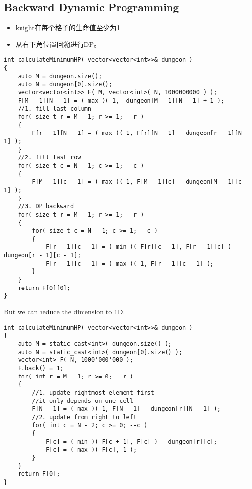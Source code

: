 \subsection{Backward Dynamic Programming}

\begin{itemize}
\item knight在每个格子的生命值至少为1
\item 从右下角位置回溯进行DP。
\end{itemize}
\setcounter{lstlisting}{0}
\begin{lstlisting}[style=customc, caption={2D DP}]
int calculateMinimumHP( vector<vector<int>>& dungeon )
{
    auto M = dungeon.size();
    auto N = dungeon[0].size();
    vector<vector<int>> F( M, vector<int>( N, 1000000000 ) );
    F[M - 1][N - 1] = ( max )( 1, -dungeon[M - 1][N - 1] + 1 );
    //1. fill last column
    for( size_t r = M - 1; r >= 1; --r )
    {
        F[r - 1][N - 1] = ( max )( 1, F[r][N - 1] - dungeon[r - 1][N - 1] );
    }
    //2. fill last row
    for( size_t c = N - 1; c >= 1; --c )
    {
        F[M - 1][c - 1] = ( max )( 1, F[M - 1][c] - dungeon[M - 1][c - 1] );
    }
    //3. DP backward
    for( size_t r = M - 1; r >= 1; --r )
    {
        for( size_t c = N - 1; c >= 1; --c )
        {
            F[r - 1][c - 1] = ( min )( F[r][c - 1], F[r - 1][c] ) - dungeon[r - 1][c - 1];
            F[r - 1][c - 1] = ( max )( 1, F[r - 1][c - 1] );
        }
    }
    return F[0][0];
}
\end{lstlisting}

But we can reduce the dimension to 1D. 

\begin{lstlisting}[style=customc, caption={1D DP}]
int calculateMinimumHP( vector<vector<int>>& dungeon )
{
    auto M = static_cast<int>( dungeon.size() );
    auto N = static_cast<int>( dungeon[0].size() );
    vector<int> F( N, 1000'000'000 );
    F.back() = 1;
    for( int r = M - 1; r >= 0; --r )
    {
        //1. update rightmost element first
        //it only depends on one cell
        F[N - 1] = ( max )( 1, F[N - 1] - dungeon[r][N - 1] );
        //2. update from right to left
        for( int c = N - 2; c >= 0; --c )
        {
            F[c] = ( min )( F[c + 1], F[c] ) - dungeon[r][c];
            F[c] = ( max )( F[c], 1 );
        }
    }
    return F[0];
}
\end{lstlisting}